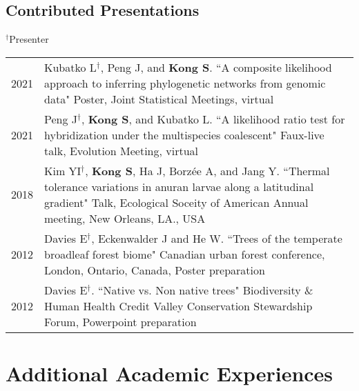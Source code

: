 \documentclass[11pt]{article}
\begin{document}
\subsection*{Contributed Presentations}
$^\dag$Presenter
\begin{longtable}{p{}  p{}}
2021 & Kubatko L$^\dag$, Peng J, and \textbf{Kong S}. ``A composite likelihood approach to inferring phylogenetic networks from genomic data" Poster, Joint Statistical Meetings, virtual \vspace{5pt} \\ 
2021 & Peng J$^\dag$, \textbf{Kong S}, and Kubatko L. ``A likelihood ratio test for hybridization under the multispecies coalescent" Faux-live talk, Evolution Meeting, virtual \vspace{5pt} \\ 
2018 & Kim YI$^\dag$, \textbf{Kong S}, Ha J, Borzée A, and Jang Y. ``Thermal tolerance variations in anuran larvae along a latitudinal gradient" Talk, Ecological Soceity of American Annual meeting, New Orleans, LA., USA \vspace{5pt} \\ 
2012 & Davies E$^\dag$, Eckenwalder J and He W. ``Trees of the temperate broadleaf forest biome"
Canadian urban forest conference, London, Ontario, Canada, Poster preparation \vspace{5pt} \\ 
2012 & Davies E$^\dag$. ``Native vs. Non native trees" Biodiversity \& Human Health Credit Valley Conservation Stewardship Forum, Powerpoint preparation \vspace{5pt} \\ 
\end{longtable}

\hspace{0pt}





\section*{Additional Academic Experiences}
\end{document}

